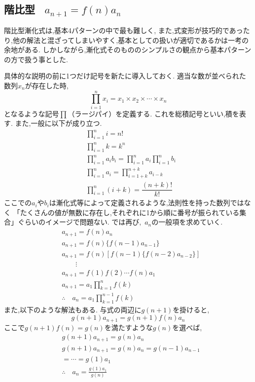 
  \subsection{階比型 \, $a_{n+1}=f(n)a_n$}
    階比型漸化式は,基本4パターンの中で最も難しく,
    また,式変形が技巧的であったり,他の解法と混ざってしまいやすく,基本としての扱いが適切であるかは一考の余地がある.
    しかしながら,漸化式そのもののシンプルさの観点から基本パターンの方で扱う事とした.
    
    具体的な説明の前に1つだけ記号を新たに導入しておく.
    適当な数が並べられた数列$x_n$が存在した時,
    \[
      \prod_{i=1}^n x_i
      =x_1\times x_2\times\cdots\times x_n
    \]
    となるような記号$\prod$（ラージパイ）を定義する.
    これを総積記号といい,積を表す.
    また,一般に以下が成り立つ.
    \begin{align*}
      &\prod_{i=1}^{n}i=n!\\
      &\prod_{i=1}^{n}k=k^n\\
      &\prod_{i=1}^{n}a_ib_i=\displaystyle\prod_{i=1}^na_i\displaystyle\prod_{i=1}^nb_i\\
      &\prod_{i=1}^{n}a_i=\displaystyle\prod_{i=1+k}^{n+k}a_{i-k}\\
      &\prod_{i=1}^{n}(i+k)=\dfrac{(n+k)!}{k!}
    \end{align*}
    ここでの$a_i$や$b_i$は漸化式等によって定義されるような,法則性を持った数列ではなく
    「たくさんの値が無数に存在し,それぞれに1から順に番号が振られている集合」ぐらいのイメージで問題ない.
    では再び, \,$a_n$の一般項を求めていく.
    \begin{align*}
      &a_{n+1}=f(n)a_n\\
      &a_{n+1}=f(n)\{f(n-1)a_{n-1}\}\\
      &a_{n+1}=f(n)\left[f(n-1)\{f(n-2)a_{n-2}\}\right]\\
      &\qquad \vdots\\
      &a_{n+1}=f(1)f(2) \cdots f(n)a_1\\
      &a_{n+1}=a_1 \prod_{k=1}^n f(k)\\
      &\therefore \quad a_n=a_1 \prod_{k=1}^{n-1} f(k)
    \end{align*}
    また,以下のような解法もある.
    与式の両辺に$g(n+1)$を掛けると,
    \[
      g(n+1)a_{n+1}=g(n+1)f(n)a_n
    \]
    ここで$g(n+1)f(n)=g(n)$を満たすような$g(n)$を選べば,
    \begin{align*}
      &g(n+1)a_{n+1}=g(n)a_n\\
      &g(n+1)a_{n+1}=g(n)a_n=g(n-1)a_{n-1}\\
      &=\cdots=g(1)a_1\\
      &\therefore \quad a_n=\frac{g(1)a_1}{g(n)}
    \end{align*}
